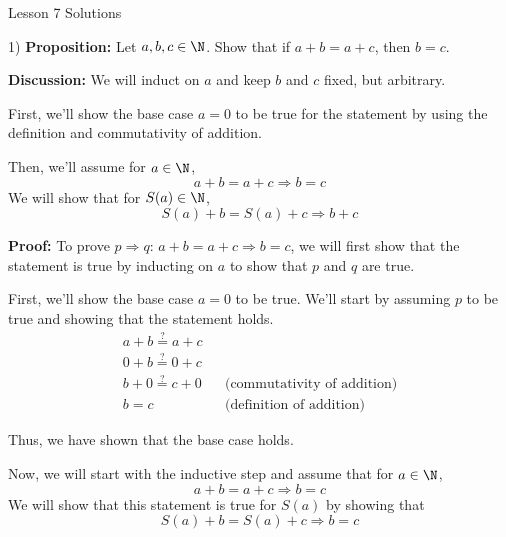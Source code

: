 


    \begin{center}
        \huge \sc Lesson 7 Solutions
    \end{center}

    \begin{paragraph}{1)}
        \textbf{Proposition:} Let $a, b, c \in \N$. Show that if $a + b = a + c$, then $b = c$.
        \spacing
        
        \textbf{Discussion:} We will induct on $a$ and keep $b$ and $c$ fixed, but arbitrary.
        \spacing

        First, we'll show the base case $a = 0$ to be true for the statement by using
        the definition and commutativity of addition.
        \spacing

        Then, we'll assume for $a \in \N$,
        $$a + b = a + c \Rightarrow b = c$$
        We will show that for $S(a) \in \N$,
        $$S(a) + b = S(a) + c \Rightarrow b + c$$

        \textbf{Proof:} To prove $p \Rightarrow q$: $a + b = a + c \Rightarrow b = c$, we will first show that the statement is true by inducting on $a$ to show that $p$ and $q$ are true.
        \spacing

        First, we'll show the base case $a = 0$ to be true. We'll start by assuming $p$ to be true and showing that 
        the statement holds.
        \begin{align*}
            a + b \stackrel{?}{=} a + c \\
            0 + b \stackrel{?}{=} 0 + c \\
            b + 0 \stackrel{?}{=} c + 0 && \text{(commutativity of addition)} \\
            b = c && \text{(definition of addition)}
        \end{align*}
        
        Thus, we have shown that the base case holds.
        \spacing

        Now, we will start with the inductive step and assume that for $a \in \N$,
        $$a + b = a + c \Rightarrow b = c$$
        We will show that this statement is true for $S(a)$ by showing that
        $$S(a) + b = S(a) + c \Rightarrow b = c$$


\end{paragraph}
